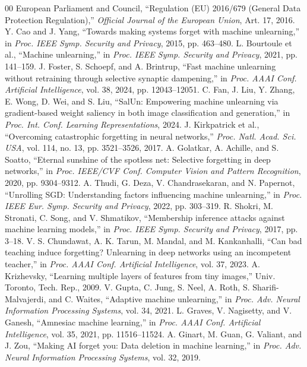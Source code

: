 \documentclass[conference]{IEEEtran}
\begin{document}
\begin{thebibliography}{00}
 European Parliament and Council, ``Regulation (EU) 2016/679 (General Data Protection Regulation),'' \textit{Official Journal of the European Union}, Art. 17, 2016.
 Y. Cao and J. Yang, ``Towards making systems forget with machine unlearning,'' in \textit{Proc. IEEE Symp. Security and Privacy}, 2015, pp. 463--480.
 L. Bourtoule et al., ``Machine unlearning,'' in \textit{Proc. IEEE Symp. Security and Privacy}, 2021, pp. 141--159.
 J. Foster, S. Schoepf, and A. Brintrup, ``Fast machine unlearning without retraining through selective synaptic dampening,'' in \textit{Proc. AAAI Conf. Artificial Intelligence}, vol. 38, 2024, pp. 12043--12051.
 C. Fan, J. Liu, Y. Zhang, E. Wong, D. Wei, and S. Liu, ``SalUn: Empowering machine unlearning via gradient-based weight saliency in both image classification and generation,'' in \textit{Proc. Int. Conf. Learning Representations}, 2024.
 J. Kirkpatrick et al., ``Overcoming catastrophic forgetting in neural networks,'' \textit{Proc. Natl. Acad. Sci. USA}, vol. 114, no. 13, pp. 3521--3526, 2017.
 A. Golatkar, A. Achille, and S. Soatto, ``Eternal sunshine of the spotless net: Selective forgetting in deep networks,'' in \textit{Proc. IEEE/CVF Conf. Computer Vision and Pattern Recognition}, 2020, pp. 9304--9312.
 A. Thudi, G. Deza, V. Chandrasekaran, and N. Papernot, ``Unrolling SGD: Understanding factors influencing machine unlearning,'' in \textit{Proc. IEEE Eur. Symp. Security and Privacy}, 2022, pp. 303--319.
 R. Shokri, M. Stronati, C. Song, and V. Shmatikov, ``Membership inference attacks against machine learning models,'' in \textit{Proc. IEEE Symp. Security and Privacy}, 2017, pp. 3--18.
 V. S. Chundawat, A. K. Tarun, M. Mandal, and M. Kankanhalli, ``Can bad teaching induce forgetting? Unlearning in deep networks using an incompetent teacher,'' in \textit{Proc. AAAI Conf. Artificial Intelligence}, vol. 37, 2023.
 A. Krizhevsky, ``Learning multiple layers of features from tiny images,'' Univ. Toronto, Tech. Rep., 2009.
 V. Gupta, C. Jung, S. Neel, A. Roth, S. Sharifi-Malvajerdi, and C. Waites, ``Adaptive machine unlearning,'' in \textit{Proc. Adv. Neural Information Processing Systems}, vol. 34, 2021.
 L. Graves, V. Nagisetty, and V. Ganesh, ``Amnesiac machine learning,'' in \textit{Proc. AAAI Conf. Artificial Intelligence}, vol. 35, 2021, pp. 11516--11524.
 A. Ginart, M. Guan, G. Valiant, and J. Zou, ``Making AI forget you: Data deletion in machine learning,'' in \textit{Proc. Adv. Neural Information Processing Systems}, vol. 32, 2019.

\end{thebibliography}
\end{document}
